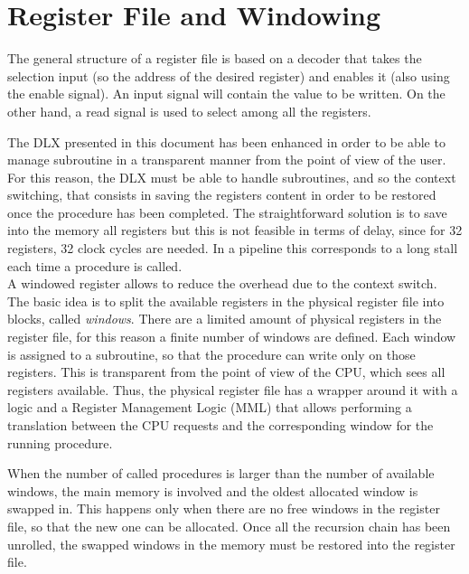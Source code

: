 \section{Register File and Windowing}
The general structure of a register file is based on a decoder that takes the selection input (so the address of the desired register) and enables it (also using the enable signal). An input signal will contain the value to be written. On the other hand, a read signal is used to select among all the registers.\newline\newline

The DLX presented in this document has been enhanced in order to be able to manage subroutine in a transparent manner from the point of view of the user. For this reason, the DLX must be able to handle subroutines, and so the context switching, that consists in saving the
registers content in order to be restored once the procedure has been completed. The straightforward solution is to save into the memory all registers but this is not feasible in terms of delay, since for 32 registers, 32 clock cycles are needed. In a pipeline this corresponds to a long stall each time a procedure is called.\\

A windowed register allows to reduce the overhead due to the context switch. The basic idea is to split the available registers in the physical register file into blocks, called \textit{windows}. There are a limited amount of physical registers in the register file, for this reason a finite number of windows are defined. Each window is assigned to a subroutine, so that the procedure can write only on those registers. This is transparent from the point of view of the CPU, which sees all registers available. Thus, the physical register file has a wrapper around it with a logic and a Register Management Logic (MML) that allows performing a translation between the CPU requests and the corresponding window for the running procedure.\newline\newline

When the number of called procedures is larger than the number of available windows, the main memory is involved and the oldest allocated window is swapped in. This happens only when there are no free windows in the register file, so that the new one can be allocated. Once all the recursion chain has been unrolled, the swapped windows in the memory must be restored into the register file.

